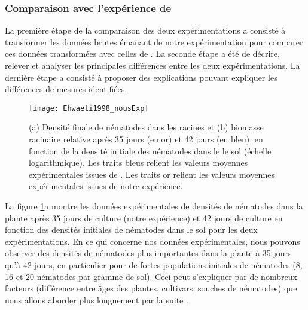 	\subsubsection{Comparaison avec l'expérience de \citet{Ehwaeti1998}}
	 La première étape de la comparaison des deux expérimentations a consisté à  transformer les données brutes émanant de notre expérimentation pour comparer ces données transformées avec celles  de \citet{Ehwaeti1998}. La seconde étape a été de décrire, relever et analyser les principales différences entre les deux expérimentations. La dernière étape a consisté à proposer des explications  pouvant expliquer les différences de mesures identifiées.
	 
	 
	    \begin{figure}[H] \centering
		    	\texttt{[image: Ehwaeti1998\_nousExp]}
			    	\caption[Comparaison des (a) densité finale de nématodes dans les racines et (b) biomasse racinaire 
			    	relative en 
			    	fonction de la densité initiale des nématodes dans le
		        le sol.]{ (a) Densité finale de nématodes dans les racines et (b) biomasse racinaire relative après 35 
		        jours  
		        (en or) et 42 jours (en bleu), en fonction de la densité initiale des nématodes dans le
		        le sol (échelle logarithmique). Les traits bleus relient les valeurs moyennes expérimentales issues de  
		        \citep{Ehwaeti1998}.  Les traits or relient les valeurs moyennes expérimentales issues de notre 
		        expérience.}
		    	\label{comp:exp}
	    \end{figure}
	    
	La figure \ref{comp:exp}a montre les données expérimentales de densités de nématodes dans la plante après 35 jours de culture (notre expérience) et 42 jours de culture  \citep{Ehwaeti1998} en fonction des densités initiales de nématodes dans le sol pour les deux expérimentations. 
En ce qui concerne nos données expérimentales, nous pouvons observer des densités de nématodes plus importantes dans la plante à 35 jours qu'à 42 jours,  en particulier pour de fortes populations initiales de nématodes (8, 16 et 20  nématodes par gramme de sol). Ceci peut s'expliquer par de nombreux facteurs (différence entre âges des plantes, cultivars, souches de nématodes) que nous allons aborder plus longuement par la suite \citep{Windham1986, Barker1991, McSorley1992}. 
	
